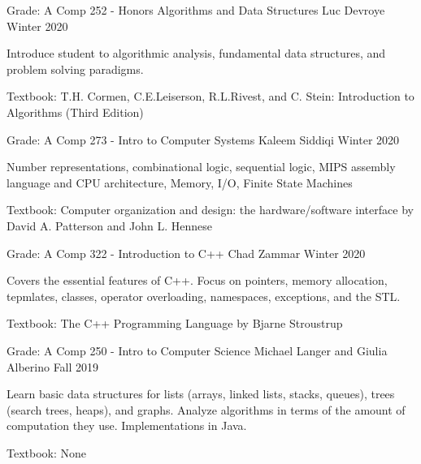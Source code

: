 \begin{cventries}
  \cventry
    {Grade: A} %
    {Comp 252 - Honors Algorithms and Data Structures} %
    {Luc Devroye} %
    {Winter 2020} %
    {
      \begin{cvitems} %
      \item {Introduce student to algorithmic analysis, fundamental data structures, and problem solving paradigms.}
      \item {Textbook: T.H. Cormen, C.E.Leiserson, R.L.Rivest, and C. Stein: Introduction to Algorithms (Third Edition)}
      \end{cvitems}
    }

    \cventry
    {Grade: A} %
    {Comp 273 - Intro to Computer Systems} %
    {Kaleem Siddiqi} %
    {Winter 2020} %
    {
      \begin{cvitems} %
      \item {Number representations, combinational logic, sequential logic, MIPS assembly language and CPU architecture, Memory, I/O, Finite State Machines}
      \item {Textbook: Computer organization and design: the hardware/software interface by David A. Patterson and John L. Hennese}
      \end{cvitems}
    }

    \cventry
    {Grade: A} %
    {Comp 322 - Introduction to C++} %
    {Chad Zammar} %
    {Winter 2020} %
    {
      \begin{cvitems} %
      \item {Covers the essential features of C++. Focus on pointers, memory allocation, tepmlates, classes, operator overloading, namespaces, exceptions, and the STL.}
      \item {Textbook: The C++ Programming Language by Bjarne Stroustrup}
      \end{cvitems}
    }

    \cventry
    {Grade: A} %
    {Comp 250 - Intro to Computer Science} %
    {Michael Langer and Giulia Alberino} %
    {Fall 2019} %
    {
      \begin{cvitems} %
      \item {Learn  basic  data  structures  for  lists  (arrays,  linked  lists,  stacks,  queues),  trees  (search trees, heaps), and graphs. Analyze algorithms in terms of the amount of computation they use. Implementations in Java.}
      \item {Textbook: None}
      \end{cvitems}
    }


\end{cventries}
